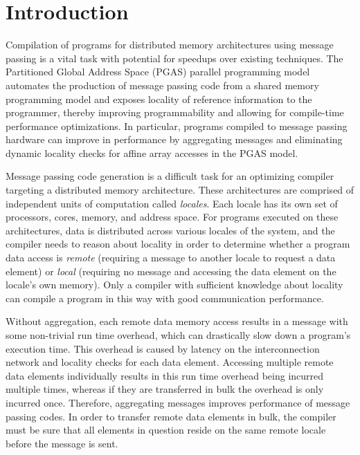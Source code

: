 
\renewcommand{\thechapter}{1}

\chapter{Introduction}\label{sec:intro} 


Compilation of programs for distributed memory architectures using message passing is a vital task with potential for speedups over existing techniques. The Partitioned Global Address Space (PGAS) parallel programming model automates the production of message passing code from a shared memory programming model and exposes locality of reference information to the programmer, thereby improving programmability and allowing for compile-time performance optimizations. In particular, programs compiled to message passing hardware can improve in performance by aggregating messages and eliminating dynamic locality checks for affine array accesses in the PGAS model. 

Message passing code generation is a difficult task for an optimizing compiler targeting a distributed memory architecture. These architectures are comprised of independent units of computation called \textit{locales}. Each locale has its own set of processors, cores, memory, and address space. For programs executed on these architectures, data is distributed across various locales of the system, and the compiler needs to reason about locality in order to determine whether a program data access is \textit{remote} (requiring a message to another locale to request a data element) or \textit{local} (requiring no message and accessing the data element on the locale's own memory). Only a compiler with sufficient knowledge about locality can compile a program in this way with good communication performance. 

Without aggregation, each remote data memory access results in a message with some non-trivial run time overhead, which can drastically slow down a program's execution time. This overhead is caused by latency on the interconnection network and locality checks for each data element. Accessing multiple remote data elements individually results in this run time overhead being incurred multiple times, whereas if they are transferred in bulk the overhead is only incurred once. Therefore, aggregating messages improves performance of message passing codes. In order to transfer remote data elements in bulk, the compiler must be sure that all elements in question reside on the same remote locale before the message is sent. 

